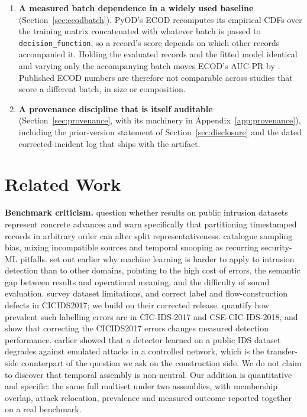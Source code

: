 \documentclass[manuscript,screen,nonacm]{acmart}
\begin{document}
\begin{enumerate}
uninformative but inverted (AUC-ROC \RevBranchAuxOnlyAucroc), and because the
score is a maximum it sets the record's score wherever the tail is small,
dragging the deployed detector to near-chance AUC-ROC (\RevBranchCombinedAucroc) while its
tail component reaches \RevBranchTailOnlyAucroc. No metric computed on the
assembled score can attribute this, and the decomposition that finds it uses
values the scorer already computes.
\item \textbf{A measured batch dependence in a widely used baseline}
(Section~\ref{sec:ecodbatch}). PyOD's ECOD recomputes its empirical CDFs over
the training matrix concatenated with whatever batch is passed to
\texttt{decision\_function}, so a record's score depends on which other records
accompanied it. Holding the evaluated records and the fitted model identical
and varying only the accompanying batch moves ECOD's AUC-PR by
\RevEcodBatchDelta. Published ECOD numbers are therefore not comparable across
studies that score a different batch, in size or composition.
\item \textbf{A provenance discipline that is itself auditable}
(Section~\ref{sec:provenance}, with its machinery in
Appendix~\ref{app:provenance}), including the prior-version statement of
Section~\ref{sec:disclosure} and the dated corrected-incident log that ships
with the artifact.
\end{enumerate}

\section{Related Work}
\label{sec:related}

\textbf{Benchmark criticism.} \citet{catillo2023hype} question
whether results on public intrusion datasets represent concrete advances and
warn specifically that partitioning timestamped records in arbitrary order can
alter split representativeness. \citet{arp2022dosdonts} catalogue
sampling bias, mixing incompatible sources and temporal snooping as recurring
security-ML pitfalls. \citet{sommer2010outside} set out
earlier why machine learning is harder to apply to intrusion detection than to
other domains, pointing to the high cost of errors, the semantic gap between
results and operational meaning, and the difficulty of sound evaluation. \citet{ring2019datasets} survey dataset
limitations, and \citet{engelen2021cicids} correct label and
flow-construction defects in CICIDS2017; we build on their corrected release.
\citet{liu2022errorprevalence} quantify how prevalent such labelling
errors are in CIC-IDS-2017 and CSE-CIC-IDS-2018, and \citet{lanvin2022errors} show that correcting the CICIDS2017 errors changes
measured detection performance.
\citet{catillo2021critique} earlier showed that a detector
learned on a public IDS dataset degrades against emulated attacks in a
controlled network, which is the transfer-side counterpart of the question we
ask on the construction side. We do not claim to discover that temporal
assembly is non-neutral. Our addition is quantitative and specific: the same
full multiset under two assemblies, with membership overlap, attack relocation,
prevalence and measured outcome reported together on a real benchmark.
\end{document}
